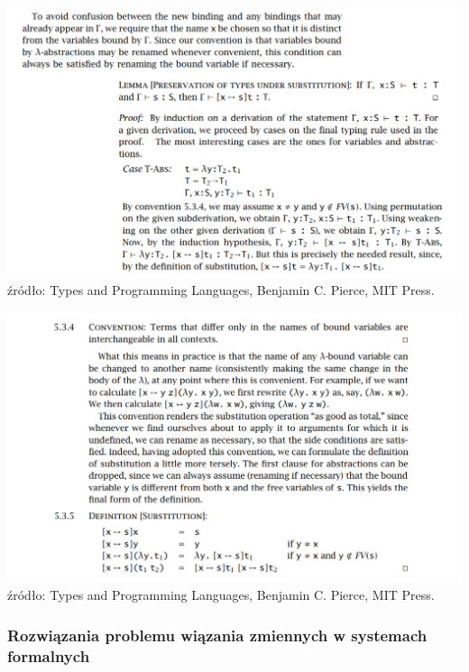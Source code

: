 \documentclass[aspectratio=169]{beamer}
\begin{document}
\begin{frame}
\includegraphics[width=\textwidth]{pierce-binding}
{\footnotesize źródło: Types and Programming Languages, Benjamin C. Pierce, MIT Press.}
\end{frame}

\begin{frame}
\includegraphics[width=\textwidth]{pierce-convention}
{\footnotesize źródło: Types and Programming Languages, Benjamin C. Pierce, MIT Press.}
\end{frame}

\begin{frame}
\frametitle{Rozwiązania problemu wiązania zmiennych w systemach formalnych}
  \begin{itemize}
  \end{itemize}
\end{frame}
\end{document}

